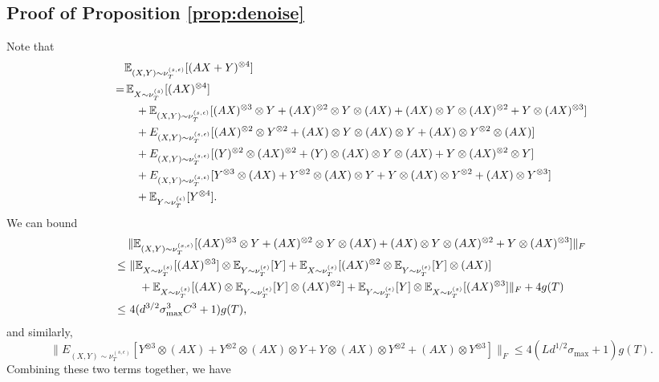 \subsection{Proof of Proposition \ref{prop:denoise}} 
\label{subsec:denoise}
Note that 
\begin{align*}
& \mathbb{E}_{(X,Y)\sim \nu_T^{(s,\epsilon)}} [(AX+Y)^{\otimes 4}]\\
 = & \,\mathbb{E}_{X\sim \nu_T^{(s)}}[(AX)^{\otimes 4}] \\
& \quad+ \mathbb{E}_{(X,Y)\sim \nu_T^{(s,\epsilon)}} [(AX)^{\otimes 3}\otimes Y + (AX)^{\otimes 2}\otimes Y\otimes (AX) + (AX)\otimes Y\otimes (AX)^{\otimes 2} + Y\otimes (AX)^{\otimes 3}] \\
& \quad+ E_{(X,Y)\sim \nu_T^{(s,\epsilon)}} [ (AX)^{\otimes 2}\otimes Y^{\otimes 2} + (AX)\otimes Y\otimes (AX)\otimes Y + (AX)\otimes Y^{\otimes 2}\otimes (AX)]\\
& \quad+  E_{(X,Y)\sim \nu_T^{(s,\epsilon)}} [ (Y)^{\otimes 2}\otimes (AX)^{\otimes 2} + (Y)\otimes (AX)\otimes Y\otimes (AX) + Y\otimes (AX)^{\otimes 2}\otimes Y] \\
& \quad+ E_{(X,Y)\sim \nu_T^{(s,\epsilon)}} [Y^{\otimes 3}\otimes (AX) + Y^{\otimes 2}\otimes (AX)\otimes Y + Y\otimes (AX)\otimes Y^{\otimes 2} + (AX)\otimes Y^{\otimes 3}] \\
& \quad+ \mathbb{E}_{Y\sim \nu_T^{(\epsilon)}}[Y^{\otimes 4}].
\end{align*}
We can bound
\begin{align*}
& \| \mathbb{E}_{(X,Y)\sim \nu_T^{(s,\epsilon)}} [(AX)^{\otimes 3}\otimes Y + (AX)^{\otimes 2}\otimes Y\otimes (AX) + (AX)\otimes Y\otimes (AX)^{\otimes 2} + Y\otimes (AX)^{\otimes 3}] \|_F \\
\le \,& \,  \| \mathbb{E}_{X\sim \nu_T^{(s)}} [(AX)^{\otimes 3}] \otimes \mathbb{E}_{Y\sim \nu_T^{(\epsilon)}}[Y] + \mathbb{E}_{X\sim \nu_T^{(s)}} [(AX)^{\otimes 2} \otimes \mathbb{E}_{Y\sim \nu_T^{(\epsilon)}}[Y] \otimes (AX)] \\
& \quad + \mathbb{E}_{X\sim \nu_T^{(s)}} [(AX) \otimes \mathbb{E}_{Y\sim \nu_T^{(\epsilon)}}[Y] \otimes (AX)^{\otimes 2}]  + \mathbb{E}_{Y\sim \nu_T^{(\epsilon)}}[Y] \otimes \mathbb{E}_{X\sim \nu_T^{(s)}} [(AX)^{\otimes 3}] \|_F + 4g(T) \\
\le \, & \,4(d^{3/2}\sigma^3_{\max}C^3 +1)g(T),
\end{align*}
and similarly, 
\[
\| E_{(X,Y)\sim \nu_T^{(s,\epsilon)}} [Y^{\otimes 3}\otimes (AX) + Y^{\otimes 2}\otimes (AX)\otimes Y + Y\otimes (AX)\otimes Y^{\otimes 2} + (AX)\otimes Y^{\otimes 3}] \|_F \le 4(Ld^{1/2}\sigma_{\max} +1)g(T).
\]
Combining these two terms together, we have 
